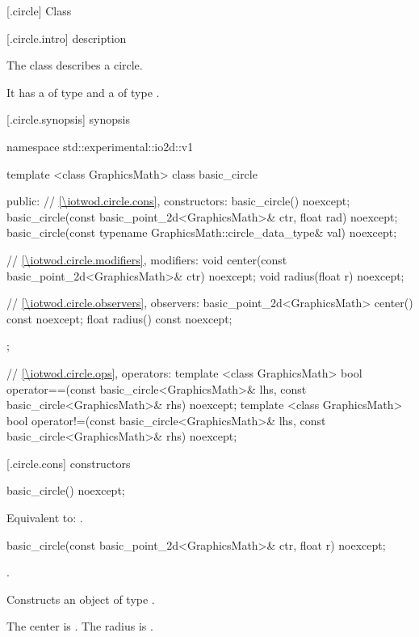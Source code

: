  [\iotwod.circle] {Class }

 [\iotwod.circle.intro] { description}

\pnum
{}%
The class  describes a circle.

\pnum
It has a  of type  and a  of type .

 [\iotwod.circle.synopsis] { synopsis}

\begin{codeblock}
namespace std::experimental::io2d::v1 {
  template <class GraphicsMath>
  class basic_circle {
  public:
    // \ref{\iotwod.circle.cons}, constructors:
    basic_circle() noexcept;
    basic_circle(const basic_point_2d<GraphicsMath>& ctr, float rad) noexcept;
    basic_circle(const typename GraphicsMath::circle_data_type& val) noexcept;

    // \ref{\iotwod.circle.modifiers}, modifiers:
    void center(const basic_point_2d<GraphicsMath>& ctr) noexcept;
    void radius(float r) noexcept;

    // \ref{\iotwod.circle.observers}, observers:
    basic_point_2d<GraphicsMath> center() const noexcept;
    float radius() const noexcept;
  };

  // \ref{\iotwod.circle.ops}, operators:
  template <class GraphicsMath>
  bool operator==(const basic_circle<GraphicsMath>& lhs,
    const basic_circle<GraphicsMath>& rhs) noexcept;
  template <class GraphicsMath>
  bool operator!=(const basic_circle<GraphicsMath>& lhs,
    const basic_circle<GraphicsMath>& rhs) noexcept;
}
\end{codeblock}

 [\iotwod.circle.cons] { constructors}

%
\begin{itemdecl}
basic_circle() noexcept;
\end{itemdecl}
\begin{itemdescr}
\pnum
\effects
Equivalent to: .
\end{itemdescr}

%
\begin{itemdecl}
basic_circle(const basic_point_2d<GraphicsMath>& ctr, float r) noexcept;
\end{itemdecl}
\begin{itemdescr}
\requires
{}.

\pnum
\effects
Constructs an object of type .

\pnum
The center is . The radius is .
\end{itemdescr}

